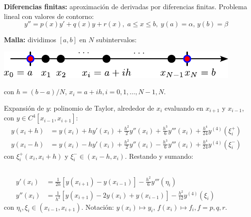 \documentclass[9pt, aspectratio=169]{beamer}
\begin{document}
\begin{frame}  %
\textbf{Diferencias finitas:} aproximación de derivadas por diferencias finitas. Problema lineal con valores de contorno:
\begin{equation} y'' = p(x) y' + q(x) y + r(x), \; a \leq x \leq b, \; y(a) = \alpha, \, y(b) = \beta \label{eq:plineal} \end{equation} \pause
\vspace{-1.0em}

\textbf{Malla:} dividimos $[a, b]$ en $N$ subintervalos:
\begin{center}
    \includegraphics[scale=1.0]{figs/grilla-1d.pdf}
\end{center}
con $h = (b-a)/N$, $x_i = a + ih, i = 0, 1, \ldots, N-1, N$. \pause

Expansión de $y$: polinomio de Taylor, alrededor de $x_i$ evaluando en $x_{i+1}$ y $x_{i-1}$, con $y \in C^4[x_{i-1}, x_{i+1}]$:
\begin{align*}
    y(x_i+h) &= y(x_i) + h y'(x_i) + \frac{h^2}{2} y''(x_i) + \frac{h^3}{6} y'''(x_i) + \frac{h^4}{24} y^{(4)}(\xi_i^+) \\
    y(x_i-h) &= y(x_i) - h y'(x_i) + \frac{h^2}{2} y''(x_i) - \frac{h^3}{6} y'''(x_i) + \frac{h^4}{24} y^{(4)}(\xi_i^-) 
\end{align*}
con $\xi_i^+ (x_i, x_i+h)$ y $\xi_i^- \in (x_i - h, x_i)$. Restando y sumando: \vspace{-0.5em}
\begin{columns}
\begin{equation}
    \begin{split}
    y'(x_i) &=\frac{1}{2h} [y(x_{i+1}) - y(x_{i-1})] - \frac{h^2}{6} y'''(\eta_i) \\
y''(x_i) &= \frac{1}{h^2} [ y(x_{i+1}) - 2 y(x_i) + y(x_{i-1})] - \frac{h^2}{12} y^{(4)}(\xi_i)
\end{split}
\label{eq:diffin}
\end{equation}
con $\eta_i, \xi_i \in (x_{i-1}, x_{i+1})$. 
Notación: $y(x_i) \mapsto y_i$, $f(x_i) \mapsto f_i, f = p, q, r$.
\end{columns}
\end{frame}
\end{document}
